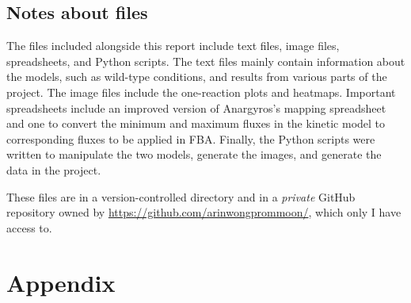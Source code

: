 \documentclass[parskip=full]{scrreprt}
\begin{document}
\section{Notes about files}
\label{sec:files}

The files included alongside this report include text files, image files, spreadsheets, and Python scripts. The text files mainly contain information about the models, such as wild-type conditions, and results from various parts of the project. The image files include the one-reaction plots and heatmaps. Important spreadsheets include an improved version of Anargyros's mapping spreadsheet and one to convert the minimum and maximum fluxes in the kinetic model to corresponding fluxes to be applied in FBA. Finally, the Python scripts were written to manipulate the two models, generate the images, and generate the data in the project.

These files are in a version-controlled directory and in a \emph{private} GitHub repository owned by \url{https://github.com/arinwongprommoon/}, which only I have access to.

\chapter*{Appendix}
\label{ch:appendix}



\nocite{*}
\printbibliography
\end{document}
